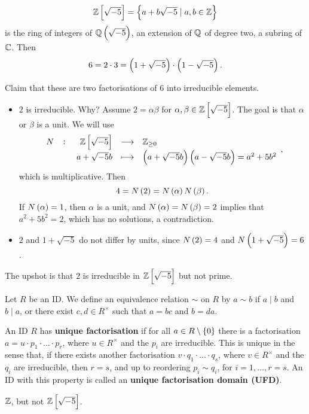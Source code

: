 \begin{example*}
$$ \Z\sbr{\sqrt{-5}} = \cbr{a + b\sqrt{-5} \mid a, b \in \Z} $$
is the ring of integers of $ \Q\br{\sqrt{-5}} $, an extension of $ \mathbb{Q} $ of degree two, a subring of $ \mathbb{C} $. Then
$$ 6 = 2 \cdot 3 = \br{1 + \sqrt{-5}} \cdot \br{1 - \sqrt{-5}}. $$

\pagebreak

Claim that these are two factorisations of $ 6 $ into irreducible elements.
\begin{itemize}
\item $ 2 $ is irreducible. Why? Assume $ 2 = \alpha\beta $ for $ \alpha, \beta \in \Z\sbr{\sqrt{-5}} $. The goal is that $ \alpha $ or $ \beta $ is a unit. We will use
$$ \function[N]{\Z\sbr{\sqrt{-5}}}{\Z_{\ge 0}}{a + \sqrt{-5}b}{\br{a + \sqrt{-5}b}\br{a - \sqrt{-5}b} = a^2 + 5b^2}, $$
which is multiplicative. Then
$$ 4 = N\br{2} = N\br{\alpha}N\br{\beta}. $$
If $ N\br{\alpha} = 1 $, then $ \alpha $ is a unit, and $ N\br{\alpha} = N\br{\beta} = 2 $ implies that $ a^2 + 5b^2 = 2 $, which has no solutions, a contradiction.
\item $ 2 $ and $ 1 + \sqrt{-5} $ do not differ by units, since $ N\br{2} = 4 $ and $ N\br{1 + \sqrt{-5}} = 6 $.
\end{itemize}
The upshot is that $ 2 $ is irreducible in $ \Z\sbr{\sqrt{-5}} $ but not prime.
\end{example*}

Let $ R $ be an ID. We define an equivalence relation $ \sim $ on $ R $ by $ a \sim b $ if $ a \mid b $ and $ b \mid a $, or there exist $ c, d \in R^\times $ such that $ a = bc $ and $ b = da $.

\begin{definition}
An ID $ R $ has \textbf{unique factorisation} if for all $ a \in R \setminus \cbr{0} $ there is a factorisation $ a = u \cdot p_1 \cdot \dots \cdot p_r $, where $ u \in R^\times $ and the $ p_i $ are irreducible. This is unique in the sense that, if there exists another factorisation $ v \cdot q_1 \cdot \dots \cdot q_s $, where $ v \in R^\times $ and the $ q_i $ are irreducible, then $ r = s $, and up to reordering $ p_i \sim q_i $, for $ i = 1, \dots, r = s $. An ID with this property is called an \textbf{unique factorisation domain (UFD)}.
\end{definition}

\begin{example*}
$ \mathbb{Z} $, but not $ \Z\sbr{\sqrt{-5}} $.
\end{example*}

